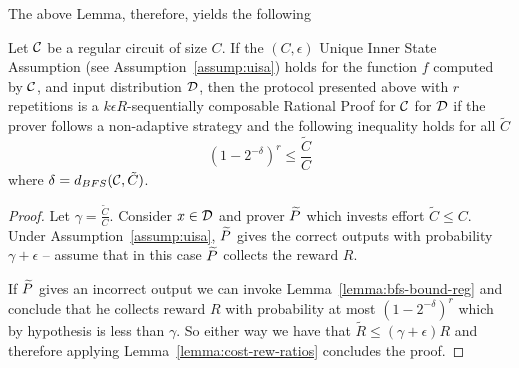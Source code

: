 The above Lemma, therefore, yields the following 

\begin{theorem}
\label{thm:reg-circ}
Let $\cal{C}$ be a regular circuit of size $C$. If the $(C,\epsilon)$ Unique Inner State Assumption (see Assumption~\ref{assump:uisa}) holds for the function $f$ computed by $\cal C$, and input distribution $\cal D$, then the protocol presented above with $r$ repetitions is a $k\epsilon R$-sequentially composable Rational Proof for $\cal{C}$ for $\cal D$ if the prover follows a non-adaptive strategy and the following inequality holds for all $\tilde{C}$ 
	$$ (1-2^{-\delta})^r \leq \frac{\tilde{C}}{C} $$
where $\delta=d_{BFS}({\cal C},\tilde{C})$.
\end{theorem}

\begin{proof}
	Let $\gamma=\frac{\tilde{C}}{C}$. 
Consider $x \in \cal D$ and prover $\widetilde{P}$ which invests effort $\tilde{C}\leq C$. Under Assumption~\ref{assump:uisa}, $\widetilde{P}$ gives the correct outputs
with probability $\gamma+\epsilon$ -- assume that in this case $\widetilde{P}$ collects the reward $R$. 

If $\widetilde{P}$ gives an incorrect output we can invoke Lemma~\ref{lemma:bfs-bound-reg} and conclude that he collects reward  
$R$ with probability at most $(1-2^{-\delta})^r$ which by hypothesis is less than $\gamma$. So either way we have that $\tilde{R} \leq (\gamma + \epsilon)R$ 
and therefore applying Lemma~\ref{lemma:cost-rew-ratios} concludes the proof.
\end{proof}